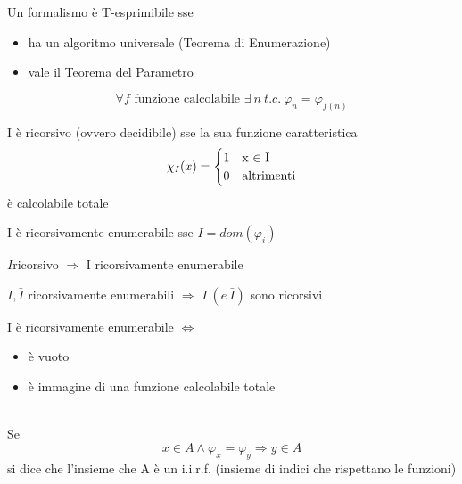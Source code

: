\documentclass[]{article}
\begin{document}
\begin{teo}[Espressività]
Un formalismo è T-esprimibile sse 
\begin{itemize}
	\item ha un algoritmo universale (Teorema di Enumerazione)
	\item vale il Teorema del Parametro
\end{itemize}
\end{teo}

\begin{teo}
$$\forall f \text{ funzione calcolabile } \exists\ n\ t.c.\ \varphi_n = \varphi_{f(n)}$$
\end{teo}

\begin{itdef}[Ricorsività]
I è ricorsivo (ovvero decidibile) sse la sua funzione caratteristica 
$$ \chi_I(x) = 
	\begin{cases} 
		1 &\mbox{x $\in$ I} \\
		0 &\mbox{\text{altrimenti}}
	\end{cases} $$
è calcolabile totale
\end{itdef}

\begin{itdef}
I è ricorsivamente enumerabile sse $I = dom(\varphi_i)$
\end{itdef}

\begin{prop}
$I$ricorsivo $\Rightarrow$ I ricorsivamente enumerabile
\end{prop}
\begin{prop}
$I, \bar{I}$ ricorsivamente enumerabili $\Rightarrow$ $I\ (e\ \bar{I})$ sono ricorsivi
\end{prop}

\begin{teo}
I è ricorsivamente enumerabile $\Leftrightarrow$ \begin{itemize} \item è vuoto \item è immagine di una funzione calcolabile totale \end{itemize}
\end{teo}

\begin{itdef} \ \\ Se
 $$x \in A \wedge  \varphi_x = \varphi_y \Rightarrow y \in A $$ si dice che l'insieme che A è un i.i.r.f. (insieme di indici che rispettano le funzioni)
\end{itdef}
\end{document}
